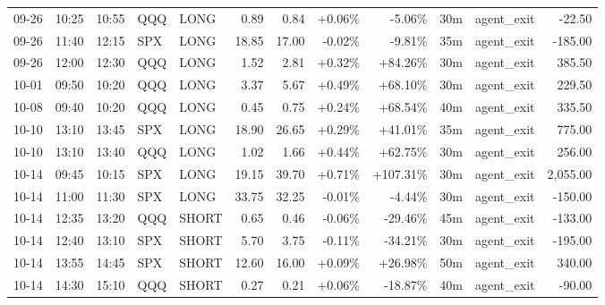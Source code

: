 \documentclass[11pt,a4paper,twoside]{article}
\begin{document}
\begin{center}
\begin{longtable}{>{\color{txtmain}}l l l l l r r r r r >{\color{txtmain}}l r}
09-26 & 10:25 & 10:55 & QQQ & LONG & 0.89 & 0.84 & \textcolor{wingreen}{+0.06\%} & \textcolor{lossred}{-5.06\%} & 30m & agent\_exit & \textcolor{lossred}{-22.50} \\
09-26 & 11:40 & 12:15 & SPX & LONG & 18.85 & 17.00 & \textcolor{lossred}{-0.02\%} & \textcolor{lossred}{-9.81\%} & 35m & agent\_exit & \textcolor{lossred}{-185.00} \\
09-26 & 12:00 & 12:30 & QQQ & LONG & 1.52 & 2.81 & \textcolor{wingreen}{+0.32\%} & \textcolor{wingreen}{+84.26\%} & 30m & agent\_exit & \textcolor{wingreen}{385.50} \\
10-01 & 09:50 & 10:20 & QQQ & LONG & 3.37 & 5.67 & \textcolor{wingreen}{+0.49\%} & \textcolor{wingreen}{+68.10\%} & 30m & agent\_exit & \textcolor{wingreen}{229.50} \\
10-08 & 09:40 & 10:20 & QQQ & LONG & 0.45 & 0.75 & \textcolor{wingreen}{+0.24\%} & \textcolor{wingreen}{+68.54\%} & 40m & agent\_exit & \textcolor{wingreen}{335.50} \\
10-10 & 13:10 & 13:45 & SPX & LONG & 18.90 & 26.65 & \textcolor{wingreen}{+0.29\%} & \textcolor{wingreen}{+41.01\%} & 35m & agent\_exit & \textcolor{wingreen}{775.00} \\
10-10 & 13:10 & 13:40 & QQQ & LONG & 1.02 & 1.66 & \textcolor{wingreen}{+0.44\%} & \textcolor{wingreen}{+62.75\%} & 30m & agent\_exit & \textcolor{wingreen}{256.00} \\
10-14 & 09:45 & 10:15 & SPX & LONG & 19.15 & 39.70 & \textcolor{wingreen}{+0.71\%} & \textcolor{wingreen}{+107.31\%} & 30m & agent\_exit & \textcolor{wingreen}{2,055.00} \\
10-14 & 11:00 & 11:30 & SPX & LONG & 33.75 & 32.25 & \textcolor{lossred}{-0.01\%} & \textcolor{lossred}{-4.44\%} & 30m & agent\_exit & \textcolor{lossred}{-150.00} \\
10-14 & 12:35 & 13:20 & QQQ & SHORT & 0.65 & 0.46 & \textcolor{lossred}{-0.06\%} & \textcolor{lossred}{-29.46\%} & 45m & agent\_exit & \textcolor{lossred}{-133.00} \\
10-14 & 12:40 & 13:10 & SPX & SHORT & 5.70 & 3.75 & \textcolor{lossred}{-0.11\%} & \textcolor{lossred}{-34.21\%} & 30m & agent\_exit & \textcolor{lossred}{-195.00} \\
10-14 & 13:55 & 14:45 & SPX & SHORT & 12.60 & 16.00 & \textcolor{wingreen}{+0.09\%} & \textcolor{wingreen}{+26.98\%} & 50m & agent\_exit & \textcolor{wingreen}{340.00} \\
10-14 & 14:30 & 15:10 & QQQ & SHORT & 0.27 & 0.21 & \textcolor{wingreen}{+0.06\%} & \textcolor{lossred}{-18.87\%} & 40m & agent\_exit & \textcolor{lossred}{-90.00} \\

\end{longtable}
\end{center}
\end{document}
